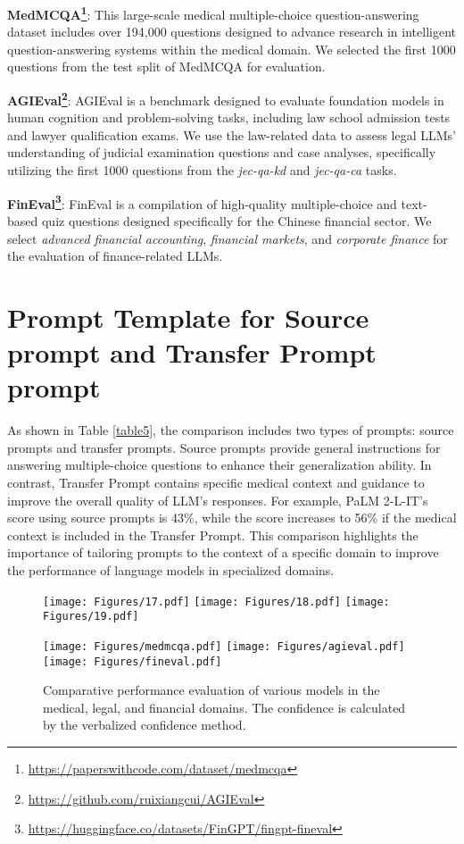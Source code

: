 \textbf{MedMCQA\footnote{\url{https://paperswithcode.com/dataset/medmcqa}}}: This large-scale medical multiple-choice question-answering dataset includes over 194,000 questions designed to advance research in intelligent question-answering systems within the medical domain. We selected the first 1000 questions from the test split of MedMCQA for evaluation.

\textbf{AGIEval\footnote{\url{https://github.com/ruixiangcui/AGIEval}}}: AGIEval is a benchmark designed to evaluate foundation models in human cognition and problem-solving tasks, including law school admission tests and lawyer qualification exams. We use the law-related data to assess legal LLMs' understanding of judicial examination questions and case analyses, specifically utilizing the first 1000 questions from the \textit{jec-qa-kd} and \textit{jec-qa-ca} tasks.

\textbf{FinEval\footnote{\url{https://huggingface.co/datasets/FinGPT/fingpt-fineval}}}: FinEval is a compilation of high-quality multiple-choice and text-based quiz questions designed specifically for the Chinese financial sector. We select \textit{advanced financial accounting}, \textit{financial markets}, and \textit{corporate finance} for the evaluation of finance-related LLMs.





\section{Prompt Template for Source prompt and Transfer Prompt prompt}
As shown in Table \ref{table5}, the comparison includes two types of prompts: source prompts and transfer prompts. Source prompts provide general instructions for answering multiple-choice questions to enhance their generalization ability. In contrast, Transfer Prompt contains specific medical context and guidance to improve the overall quality of LLM's responses. For example, PaLM 2-L-IT's score using source prompts is 43\%, while the score increases to 56\% if the medical context is included in the Transfer Prompt. This comparison highlights the importance of tailoring prompts to the context of a specific domain to improve the performance of language models in specialized domains.

\begin{figure*}[!h]
\centering
\texttt{[image: Figures/17.pdf]} 
\hfill
\texttt{[image: Figures/18.pdf]} 
\hfill
\texttt{[image: Figures/19.pdf]} 
\hspace{3em}

\texttt{[image: Figures/medmcqa.pdf]} 
\hfill
\texttt{[image: Figures/agieval.pdf]} 
\hfill
\texttt{[image: Figures/fineval.pdf]} 
\caption{Comparative performance evaluation of various models in the medical, legal, and financial domains. The confidence is calculated by the verbalized confidence method.}
\label{fig-sensitive2}
\end{figure*}

